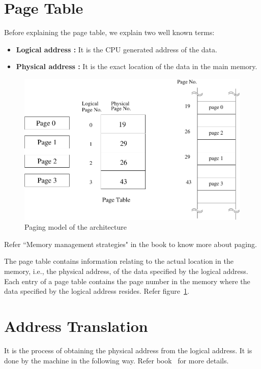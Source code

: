 \section{Page Table}

Before explaining the page table, we explain two well known terms:
\begin{itemize}
	\item \textbf{Logical address :} It is the CPU generated address of the data. 
	\item \textbf{Physical address :} It is the exact location of the data in the main memory.
\end{itemize}

\begin{figure}[h!]
	\centering
	\includegraphics[scale=0.55]{pics/paging}
	\caption{Paging model of the \ESIM architecture}
	\label{fig:paging}
\end{figure}

Refer ``Memory management strategies" in the book \cite{galvin} to know more about paging. 

The page table contains information relating to the actual location in the memory, i.e., the physical address, of the data specified by the logical address. Each entry of a page table contains the page number in the memory where the data specified by the logical address resides. Refer figure~\ref{fig:paging}.


\section{Address Translation} 
It is the process of obtaining the physical address from the logical address. It is done by the machine in the following way. Refer book~\cite{Bach} for more details.

